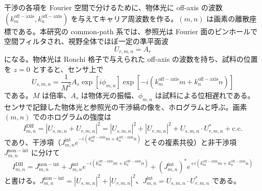 干渉の各項を Fourier 空間で分けるために、物体光に off-axis の波数 $(k_m^{\mathrm{off-axis}}, k_n^{\mathrm{off-axis}})$ を与えてキャリア周波数を作る。$(m, n)$ は画素の離散座標である。本研究の common-path 系では、参照光は Fourier 面のピンホールで空間フィルタされ、視野全体でほぼ一定の準平面波
\begin{equation}
U_{r,m,n} = A_r
\end{equation}
になる。物体光は Ronchi 格子で与えられた off-axis の波数を持ち、試料の位置を $z = 0$ とすると、センサ上で
\begin{equation}
U_{s,m,n} = \frac{1}{M^2} A_s \exp[i\phi_{m,n}] \exp[-i(k_m^{\mathrm{off-axis}} m + k_n^{\mathrm{off-axis}} n)]
\end{equation}
である。$M$ は倍率、$A_s$ は物体光の振幅、$\phi_{m,n}$ は試料による位相遅れである。センサで記録した物体光と参照光の干渉縞の像を、ホログラムと呼ぶ。画素 $(m,n)$ でのホログラムの強度は
\begin{equation}
I_{m,n}^{\mathrm{DH}} = \left|U_{s,m,n} + U_{r,m,n}\right|^2 = |U_{s,m,n}|^2 + |U_{r,m,n}|^2 + U_{s,m,n} \cdot U_{r,m,n}^* + \mathrm{c.c.}
\end{equation}
であり、干渉項（$J_{m,n}^{\mathrm{int}} e^{-i(k_m^{\mathrm{off-axis}}m + k_n^{\mathrm{off-axis}}n)}$ とその複素共役）と非干渉項 $J_{m,n}^{\mathrm{non-int}}$ に分けて
\begin{equation}
\label{eq:hologram_DH}
I_{m,n}^{\mathrm{DH}} = J_{m,n}^{\mathrm{non-int}} + J_{m,n}^{\mathrm{int}} e^{-i(k_m^{\mathrm{off-axis}}m + k_n^{\mathrm{off-axis}}n)} + (J_{m,n}^{\mathrm{int}})^* e^{+i(k_m^{\mathrm{off-axis}}m + k_n^{\mathrm{off-axis}}n)}
\end{equation}
と書ける。$J_{m,n}^{\mathrm{non-int}} = |U_{s,m,n}|^2 + |U_{r,m,n}|^2$、$J_{m,n}^{\mathrm{int}} = U_{s,m,n} \cdot U_{r,m,n}^*$ である。


